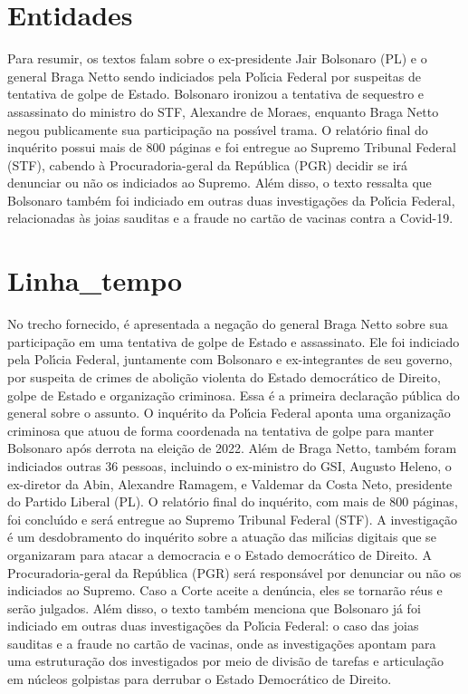 \documentclass[article,11pt,oneside,a4paper,brazil,sumario=tradicional]{abntex2}%
\begin{document}
\section{Entidades}%
\label{sec:Entidades}%
Para resumir, os textos falam sobre o ex-presidente Jair Bolsonaro (PL) e o general Braga Netto sendo indiciados pela Pol{\'\i}cia Federal por suspeitas de tentativa de golpe de Estado. Bolsonaro ironizou a tentativa de sequestro e assassinato do ministro do STF, Alexandre de Moraes, enquanto Braga Netto negou publicamente sua participa\c{c}\~ao na poss{\'\i}vel trama. O relat\'orio final do inqu\'erito possui mais de 800 p\'aginas e foi entregue ao Supremo Tribunal Federal (STF), cabendo \`a Procuradoria-geral da Rep\'ublica (PGR) decidir se ir\'a denunciar ou n\~ao os indiciados ao Supremo. Al\'em disso, o texto ressalta que Bolsonaro tamb\'em foi indiciado em outras duas investiga\c{c}\~oes da Pol{\'\i}cia Federal, relacionadas \`as joias sauditas e a fraude no cart\~ao de vacinas contra a Covid-19.

%
\section{Linha\_tempo}%
\label{sec:Linhatempo}%
No trecho fornecido, \'e apresentada a nega\c{c}\~ao do general Braga Netto sobre sua participa\c{c}\~ao em uma tentativa de golpe de Estado e assassinato. Ele foi indiciado pela Pol{\'\i}cia Federal, juntamente com Bolsonaro e ex-integrantes de seu governo, por suspeita de crimes de aboli\c{c}\~ao violenta do Estado democr\'atico de Direito, golpe de Estado e organiza\c{c}\~ao criminosa. Essa \'e a primeira declara\c{c}\~ao p\'ublica do general sobre o assunto. O inqu\'erito da Pol{\'\i}cia Federal aponta uma organiza\c{c}\~ao criminosa que atuou de forma coordenada na tentativa de golpe para manter Bolsonaro ap\'os derrota na elei\c{c}\~ao de 2022. Al\'em de Braga Netto, tamb\'em foram indiciados outras 36 pessoas, incluindo o ex-ministro do GSI, Augusto Heleno, o ex-diretor da Abin, Alexandre Ramagem, e Valdemar da Costa Neto, presidente do Partido Liberal (PL). O relat\'orio final do inqu\'erito, com mais de 800 p\'aginas, foi conclu{\'\i}do e ser\'a entregue ao Supremo Tribunal Federal (STF). A investiga\c{c}\~ao \'e um desdobramento do inqu\'erito sobre a atua\c{c}\~ao das mil{\'\i}cias digitais que se organizaram para atacar a democracia e o Estado democr\'atico de Direito. A Procuradoria-geral da Rep\'ublica (PGR) ser\'a respons\'avel por denunciar ou n\~ao os indiciados ao Supremo. Caso a Corte aceite a den\'uncia, eles se tornar\~ao r\'eus e ser\~ao julgados. Al\'em disso, o texto tamb\'em menciona que Bolsonaro j\'a foi indiciado em outras duas investiga\c{c}\~oes da Pol{\'\i}cia Federal: o caso das joias sauditas e a fraude no cart\~ao de vacinas, onde as investiga\c{c}\~oes apontam para uma estrutura\c{c}\~ao dos investigados por meio de divis\~ao de tarefas e articula\c{c}\~ao em n\'ucleos golpistas para derrubar o Estado Democr\'atico de Direito.
\end{document}

